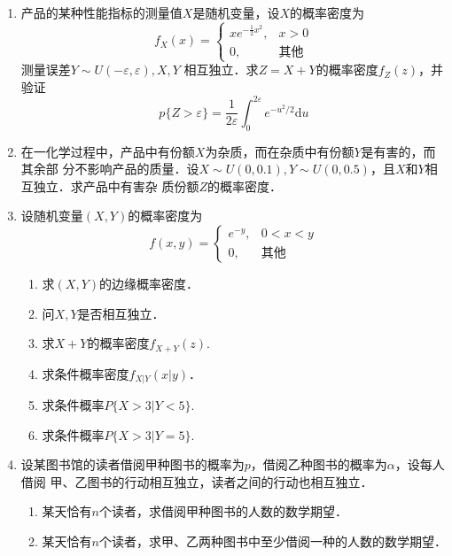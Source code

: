 \documentclass[10pt,a4paper]{article}
\begin{document}
\begin{enumerate}
    \item 产品的某种性能指标的测量值$X$是随机变量，设$X$的概率密度为
    $$f_X(x)=\left\{\begin{array}{ll}
        xe^{-\frac{1}{2}x^2}, & x>0\\
        0, & \mbox{其他}
    \end{array}\right.$$
    测量误差$Y\sim U(-\varepsilon ,\varepsilon),X,Y$ 相互独立．求$Z=X+Y$的概率密度$f_Z(z)$，并验证
    $$p\{Z>\varepsilon\}=\frac{1}{2\varepsilon}\int_0^{2\varepsilon} e^{-u^2/2}\mathrm{d}u$$




    \item 在一化学过程中，产品中有份额$X$为杂质，而在杂质中有份额$Y$是有害的，而其余部
    分不影响产品的质量．设$X\sim U(0,0.1),Y\sim U(0,0.5)$，且$X$和$Y$相互独立．求产品中有害杂
    质份额$Z$的概率密度．




    \item 设随机变量$(X,Y)$的概率密度为
    $$f(x,y)=\left\{\begin{array}{ll}
        e^{-y}, & 0<x<y\\
        0, & \mbox{其他}
    \end{array}\right.$$
    \begin{enumerate}
        \item 求$(X,Y)$的边缘概率密度．
        \item 问$X,Y$是否相互独立．
        \item 求$X+Y$的概率密度$f_{X+Y}(z)$.
        \item 求条件概率密度$f_{X|Y}(x|y)$．
        \item 求条件概率$P\{X>3|Y<5\}$.
        \item 求条件概率$P\{X>3|Y=5\}$.
    \end{enumerate}



    \item 设某图书馆的读者借阅甲种图书的概率为$p$，借阅乙种图书的概率为$\alpha$，设每人借阅
    甲、乙图书的行动相互独立，读者之间的行动也相互独立．
    \begin{enumerate}
        \item 某天恰有$n$个读者，求借阅甲种图书的人数的数学期望．
        \item 某天恰有$n$个读者，求甲、乙两种图书中至少借阅一种的人数的数学期望．
    \end{enumerate}




\end{enumerate}
\end{document}
